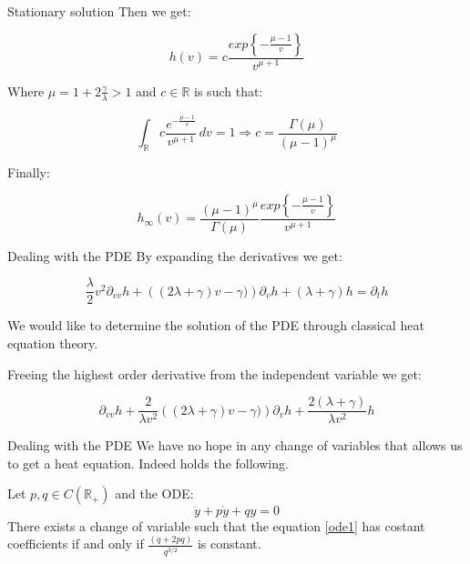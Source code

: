 \documentclass[10pt, compress]{beamer}
\begin{document}
\begin{frame}{Stationary solution}
    Then we get:

    \[h(v) = c\frac{exp\left\{-\frac{\mu-1}{v}\right\}}{v^{\mu+1}}\]

    Where $\mu=1+2\frac{\gamma}{\lambda}>1$ and $c\in\mathbb{R}$ is such that:

    \[\int_{\mathbb{R}}c\frac{e^{-\frac{\mu-1}{v}}}{v^{\mu+1}} \,dv=1 \Rightarrow c=\frac{\Gamma(\mu)}{(\mu-1)^{\mu}}\]

    Finally:

    \[h_{\infty}(v)=\frac{(\mu-1)^{\mu}}{\Gamma(\mu)}\frac{exp\left\{-\frac{\mu-1}{v}\right\}}{v^{\mu+1}}\]
    
\end{frame}

\begin{frame}{Dealing with the PDE}
    By expanding the derivatives we get:

\begin{equation*}\label{eq1.1}
    \frac{\lambda}{2}v^2\partial_{vv}h+\left((2\lambda+\gamma)v-\gamma)\right)\partial_vh+(\lambda+\gamma)h=\partial_t h
\end{equation*}

We would like to determine the solution of the PDE through classical heat equation theory.

Freeing the highest order derivative from the independent variable we get:

\[\partial_{vv}h+\frac{2}{\lambda v^2}\left((2\lambda+\gamma)v-\gamma)\right)\partial_vh+\frac{2(\lambda+\gamma)}{\lambda v^2}h\]


\end{frame}

\begin{frame}{Dealing with the PDE}
  We have no hope in any change of variables that allows us to get a heat equation. Indeed holds the following.

\begin{theorem}
Let $p,q\in C(\mathbb{R}_+)$ and the ODE:
\begin{equation*}\label{ode1}\ddot{y}+p\dot{y}+qy=0\end{equation*}
There exists a change of variable such that the equation \ref{ode1} has costant coefficients if and only if $\frac{(\dot{q}+2pq)}{q^{3/2}}$ is constant.
\end{theorem}
  
\end{frame}
\end{document}
